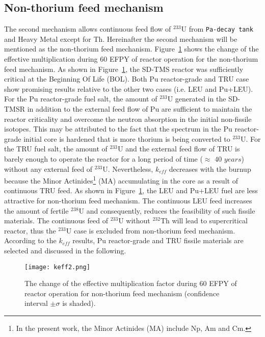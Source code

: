 \subsection{Non-thorium feed mechanism}

The second mechanism allows continuous feed flow of $^{233}$U from \texttt{Pa-decay tank} and Heavy Metal except for Th. Hereinafter the second mechanism will be mentioned as the non-thorium feed mechanism. Figure~\ref{fig:keff2} shows the change of the effective multiplication during 60 \gls{EFPY} of reactor operation for the non-thorium feed mechanism.
As shown in Figure~\ref{fig:keff2}, the SD-TMS reactor was sufficiently critical at the Beginning Of Life (BOL). Both Pu reactor-grade and TRU case show promising results relative to the other two cases (i.e. LEU and Pu+LEU). For the Pu reactor-grade fuel salt, the amount of $^{233}$U generated in the \gls{SD-TMSR} in addition to the external feed flow of Pu are sufficient to maintain the reactor criticality and overcome the neutron absorption in the initial non-fissile isotopes. This may be attributed to the fact that the spectrum in the Pu reactor-grade initial core is hardened that is more thorium is being converted to $^{233}$U. For the \gls{TRU} fuel salt, the amount of $^{233}$U and the external feed flow of TRU is barely enough to operate the reactor for a long period of time ($\approx$ $40$ $years$) without any external feed of $^{233}$U. Nevertheless, $k_{eff}$ decreases with the burnup because the Minor Actinides\footnote{In the present work, the Minor Actinides (MA) include Np, Am and Cm.} (MA) accumulating in the core as a result of continuous TRU feed. As shown in Figure~\ref{fig:keff2}, the LEU and Pu+LEU fuel are less attractive for non-thorium feed mechanism. The continuous LEU feed increases the amount of fertile $^{238}$U and consequently, reduces the feasibility of such fissile materials. The continuous feed of $^{233}$U without $^{232}$Th will lead to supercritical reactor, thus the $^{233}$U case is excluded from non-thorium feed mechanism.\\
According to the $k_{eff}$ results, Pu reactor-grade and TRU fissile materials are selected and discussed in the following. 
\begin{figure}
	\centering
	\texttt{[image: keff2.png]}
	\caption{The change of the effective multiplication factor during 60 \gls{EFPY} of reactor operation for non-thorium feed mechanism (confidence interval $\pm\sigma$ is shaded).} 
	\label{fig:keff2}
\end{figure}

